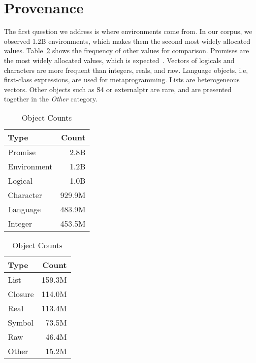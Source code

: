 \documentclass[10pt,review,sigplan,anonymous=true,authorversion=true,nonacm=true]{acmart}
\begin{document}
\section{Provenance}

The first question we address is where environments come from. In our corpus, we
observed 1.2B environments, which makes them the second most widely allocated
values. Table~\ref{table:object_count_dist} shows the frequency of other values
for comparison. Promises are the most widely allocated values, which is
expected~\cite{oopsla19b}. Vectors of logicals and characters are more frequent
than integers, reals, and raw. Language objects, i.e, first-class expressions,
are used for metaprogramming. Lists are heterogeneous vectors. Other objects
such as S4 or externalptr are rare, and are presented together in the
\emph{Other} category.

\begin{table}[!h]
  \vspace{-3mm}
  \small
  \caption{Object Counts} \label{table:object_count_dist}
  \centering
  \begin{tabular}{lr}
    \toprule
    \textbf{Type}&\textbf{Count}\\
    \midrule
    Promise&2.8B\\
    Environment&1.2B\\
    Logical&1.0B\\
    Character&929.9M\\
    Language&483.9M\\
    Integer&453.5M\\
    \bottomrule
  \end{tabular}
  \begin{tabular}{lr}
    \toprule
    \textbf{Type}&\textbf{Count}\\
    \midrule
    List&159.3M\\
    Closure&114.0M\\
    Real&113.4M\\
    Symbol&73.5M\\
    Raw&46.4M\\
    Other&15.2M\\
    \bottomrule
  \end{tabular}
\end{table}
\end{document}
